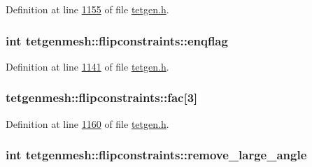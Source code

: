 Definition at line \hyperlink{tetgen_8h_source_l01155}{1155} of file \hyperlink{tetgen_8h_source}{tetgen.\+h}.

\subsubsection[{\texorpdfstring{enqflag}{enqflag}}]{\setlength{\rightskip}{0pt plus 5cm}int tetgenmesh\+::flipconstraints\+::enqflag}\hypertarget{classtetgenmesh_1_1flipconstraints_ad16c3c6607dd1bedc7b580245ed34f56}{}\label{classtetgenmesh_1_1flipconstraints_ad16c3c6607dd1bedc7b580245ed34f56}


Definition at line \hyperlink{tetgen_8h_source_l01141}{1141} of file \hyperlink{tetgen_8h_source}{tetgen.\+h}.

\subsubsection[{\texorpdfstring{fac}{fac}}]{ tetgenmesh\+::flipconstraints\+::fac\mbox{[}3\mbox{]}}\hypertarget{classtetgenmesh_1_1flipconstraints_a99946dec792882c06d7608bb9967e5bb}{}\label{classtetgenmesh_1_1flipconstraints_a99946dec792882c06d7608bb9967e5bb}


Definition at line \hyperlink{tetgen_8h_source_l01160}{1160} of file \hyperlink{tetgen_8h_source}{tetgen.\+h}.

\subsubsection[{\texorpdfstring{remove\+\_\+large\+\_\+angle}{remove_large_angle}}]{\setlength{\rightskip}{0pt plus 5cm}int tetgenmesh\+::flipconstraints\+::remove\+\_\+large\+\_\+angle}\hypertarget{classtetgenmesh_1_1flipconstraints_abc7659ab61a966b1a47560fd07a58ccb}{}\label{classtetgenmesh_1_1flipconstraints_abc7659ab61a966b1a47560fd07a58ccb}



